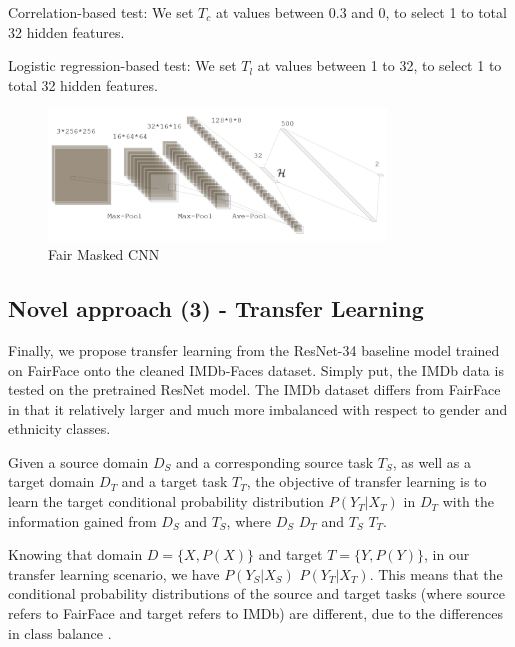 Correlation-based test: We set $T_c$ at values between 0.3 and 0, to select 1 to total 32 hidden features.

Logistic regression-based test: We set $T_l$ at values between 1 to 32, to select 1 to total 32 hidden features.

\begin{figure}[H]
	\centering
	\includegraphics[width=0.8\textwidth]{figure/fairmaskedCNN.png}
	\caption{Fair Masked CNN}
	\label{fig: fairmaskedcnn-structure}
\end{figure}


\subsection{Novel approach (3) - Transfer Learning}

Finally, we propose transfer learning from the ResNet-34 baseline model trained on FairFace onto the cleaned IMDb-Faces dataset. Simply put, the IMDb data is tested on the pretrained ResNet model. The IMDb dataset differs from FairFace in that it relatively larger and much more imbalanced with respect to gender and ethnicity classes.

Given a source domain $D_S$ and a corresponding source task $T_S$, as well as a target domain $D_T$ and a target task $T_T$, the objective of transfer learning is to learn the target conditional probability distribution $P(Y_T | X_T)$ in $D_T$ with the information gained from $D_S$ and $T_S$, where $D_S$ \neq $D_T$ and $T_S$ \neq $T_T$. 

Knowing that domain $D=\{X,P(X)\}$ and target $T=\{Y,P(Y)\}$, in our transfer learning scenario, we have $P(Y_S | X_S)$ \neq $P(Y_T | X_T)$. This means that the conditional probability distributions of the source and target tasks (where source refers to FairFace and target refers to IMDb) are different, due to the differences in class balance \cite{ruder_2019}.